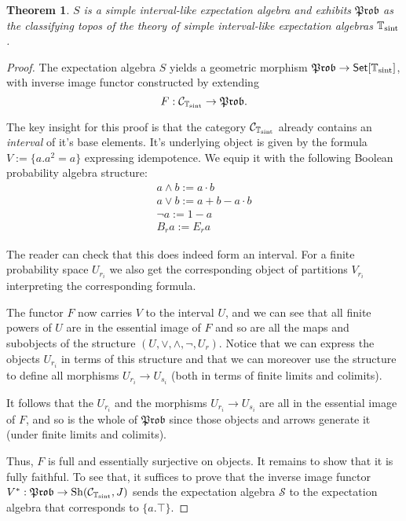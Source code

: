 \documentclass[a4paper]{amsproc}
\theoremstyle{plain}
\newtheorem{theorem}{Theorem}[section]
\theoremstyle{definition}
\theoremstyle{remark}
\numberwithin{equation}{section}
\DeclareMathOperator{\Sh}{Sh}
\newcommand{\Set}{\textup{\textsf{Set}}}
\newcommand{\Prob}{\mathfrak{Prob}}
\begin{document}
\begin{theorem}\label{classifying_sint}
    $S$ is a simple interval-like expectation algebra and exhibits $\Prob$ as the classifying topos of the theory of simple interval-like expectation algebras $\mathbb{T}_{\textup{sint}}$.
\end{theorem}
\begin{proof}
    The expectation algebra $S$ yields a geometric morphism $\Prob \to \Set[\mathbb{T}_{\textup{sint}}]$, with inverse image functor constructed by extending
    \[
        F: \mathcal{C}_{\mathbb{T}_{\textup{sint}}} \to \Prob .
    \]

    The key insight for this proof is that the category $\mathcal{C}_{\mathbb{T}_{\textup{sint}}}$ already contains an \emph{interval} of it's base elements. It's underlying object is given by the formula $V := \{ a . a^2 = a\}$ expressing idempotence. We equip it with the following Boolean probability algebra structure:
    \begin{align*}
        a \wedge b := a \cdot b \\
        a \vee b := a + b - a \cdot b \\
        \neg a := 1 - a \\
        B_r a := E_r a
    \end{align*}

    The reader can check that this does indeed form an interval. For a finite probability space $U_{r_i}$ we also get the corresponding object of partitions $V_{r_i}$ interpreting the corresponding formula.

    The functor $F$ now carries $V$ to the interval $U$, and we can see that all finite powers of $U$ are in the essential image of $F$ and so are all the maps and subobjects of the structure $(U,\vee,\wedge,\neg,U_r)$. Notice that we can express the objects $U_{r_i}$ in terms of this structure and that we can moreover use the structure to define all morphisms $U_{r_i} \to U_{s_i}$ (both in terms of finite limits and colimits).
    
    It follows that the $U_{r_i}$ and the morphisms $U_{r_i} \to U_{s_i}$ are all in the essential image of $F$, and so is the whole of $\Prob$ since those objects and arrows generate it (under finite limits and colimits).

    Thus, $F$ is full and essentially surjective on objects. It remains to show that it is fully faithful. To see that, it suffices to prove that the inverse image functor $V^*: \Prob \to \Sh(\mathcal{C}_{\mathbb{T}_{\textup{sint}}}, J)$ sends the expectation algebra $\mathcal{S}$ to the expectation algebra that corresponds to $\{ a . \top \}$.


\end{proof}
\end{document}
